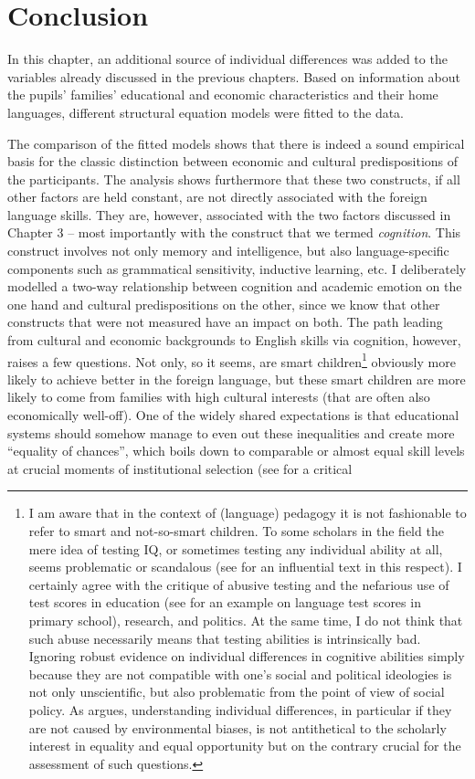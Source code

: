 \documentclass[output=paper]{langsci/langscibook}
\begin{document}
\section{Conclusion}

In this chapter, an additional source of individual differences was added to the variables already discussed in the previous chapters. Based on information about the pupils’ families’ educational and economic characteristics and their home languages, different structural equation models were fitted to the data.

The comparison of the fitted models shows that there is indeed a sound empirical basis for the classic distinction between economic and cultural predispositions of the participants. The analysis shows furthermore that these two constructs, if all other factors are held constant, are not directly associated with the foreign language skills. They are, however, associated with the two factors discussed in Chapter 3 -- most importantly with the construct that we termed \textit{cognition}. This construct involves not only memory and intelligence, but also language-specific components such as grammatical sensitivity, inductive learning, etc. I deliberately modelled a two-way relationship between cognition and academic emotion on the one hand and cultural predispositions on the other, since we know that other constructs that were not measured have an impact on both. The path leading from cultural and economic backgrounds to English skills via cognition, however, raises a few questions. Not only, so it seems, are smart children\footnote{I am aware that in the context of (language) pedagogy it is not fashionable to refer to smart and not-so-smart children. To some scholars in the field the mere idea of testing IQ, or sometimes testing any individual ability at all, seems problematic or scandalous (see \citealt[186]{Foucault1975} for an influential text in this respect). I certainly agree with the critique of abusive testing and the nefarious use of test scores in education (see \citealt{KuhnMai2015} for an example on language test scores in primary school), research, and politics. At the same time, I do not think that such abuse necessarily means that testing abilities is intrinsically bad. Ignoring robust evidence on individual differences in cognitive abilities simply because they are not compatible with one’s social and political ideologies is not only unscientific, but also problematic from the point of view of social policy. As \citet[chapter 9]{Plomin2019} argues, understanding individual differences, in particular if they are not caused by environmental biases, is not antithetical to the scholarly interest in equality and equal opportunity but on the contrary crucial for the assessment of such questions.} obviously more likely to achieve better in the foreign language, but these smart children are more likely to come from families with high cultural interests (that are often also economically well-off). One of the widely shared expectations is that educational systems should somehow manage to even out these inequalities and create more ``equality of chances'', which boils down to comparable or almost equal skill levels at crucial moments of institutional selection (see \citealt{Heid1988} for a critical 
\end{document}
